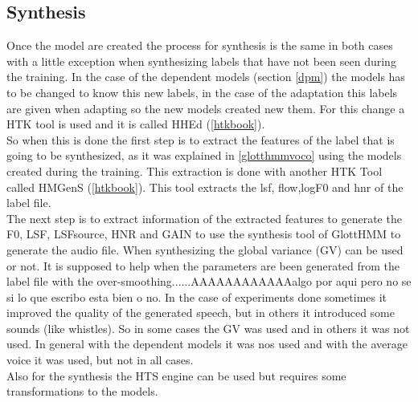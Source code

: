 \subsection{Synthesis}\label{synt}
Once the model are created the process for synthesis is the same in both cases with a little exception when synthesizing labels that have not been seen during the training. In the case of the dependent models (section \ref{dpm}) the models has to be changed to know this new labels, in the case of the adaptation this labels are given when adapting so the new models created new them. For this change a HTK tool is used and it is called HHEd (\ref{htkbook}).\\
So when this is done the first step is to extract the features of the label that is going to be synthesized, as it was explained in \ref{glotthmmvoco} using the models created during the training. This extraction is done with another HTK Tool called HMGenS (\ref{htkbook}). This tool extracts the lsf, flow,logF0 and hnr of the label file.\\
The next step is to extract information of the extracted features to generate the F0, LSF, LSFsource, HNR and GAIN to use the synthesis tool of GlottHMM to generate the audio file.
When synthesizing the global variance (GV) can be used or not. It is supposed to help when the parameters are been generated from the label file with the over-smoothing......AAAAAAAAAAAAalgo por aqui pero no se si lo que escribo esta bien o no. In the case of experiments done sometimes it improved the quality of the generated speech, but in others it introduced some sounds (like whistles). So in some cases the GV was used and in others it was not used. In general with the dependent models it was nos used and with the average voice it was used, but not in all cases.\\ 
Also for the synthesis the HTS engine can be used but requires some transformations to the models.